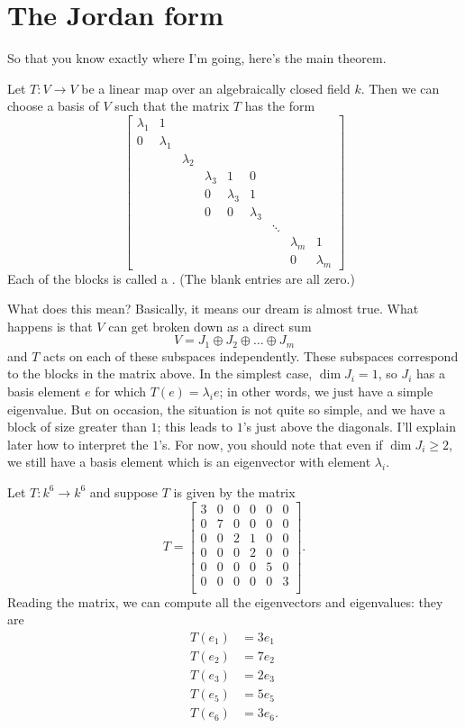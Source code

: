 \section{The Jordan form}
So that you know exactly where I'm going, here's the main theorem.
\begin{theorem}
	Let $T : V \to V$ be a linear map over an algebraically closed field $k$.
	Then we can choose a basis of $V$ such that the matrix $T$ has the form
	\[
	\begin{bmatrix}
		\lambda_1 & 1 \\
		0 & \lambda_1 \\
		&& \lambda_2 \\
		&&& \lambda_3 & 1 & 0 \\
		&&& 0 & \lambda_3 & 1 \\
		&&& 0 & 0 & \lambda_3 \\
		&&&&&& \ddots \\
		&&&&&&& \lambda_m & 1 \\
		&&&&&&& 0 & \lambda_m
	\end{bmatrix}
	\]
	Each of the blocks is called a .
	(The blank entries are all zero.)
\end{theorem}
What does this mean?
Basically, it means our dream is almost true.
What happens is that $V$ can get broken down as a direct sum
\[ V = J_1 \oplus J_2 \oplus \dots \oplus J_m \]
and $T$ acts on each of these subspaces independently.
These subspaces correspond to the blocks in the matrix above.
In the simplest case, $\dim J_i = 1$, so $J_i$ has a basis element $e$ for which $T(e) = \lambda_i e$;
in other words, we just have a simple eigenvalue.
But on occasion, the situation is not quite so simple, and we have a block of size greater than $1$;
this leads to $1$'s just above the diagonals.
I'll explain later how to interpret the $1$'s.
For now, you should note that even if $\dim J_i \ge 2$, we still have a basis element
which is an eigenvector with element $\lambda_i$.

\begin{example}
	Let $T : k^6 \to k^6$ and suppose $T$ is given by the matrix
	\[ 
		T = \begin{bmatrix}
			3 & 0 & 0 & 0 & 0 & 0 \\
			0 & 7 & 0 & 0 & 0 & 0 \\
			0 & 0 & 2 & 1 & 0 & 0 \\
			0 & 0 & 0 & 2 & 0 & 0 \\
			0 & 0 & 0 & 0 & 5 & 0 \\
			0 & 0 & 0 & 0 & 0 & 3 \\
		\end{bmatrix}.
	\]
	Reading the matrix, we can compute all the eigenvectors and eigenvalues:
	they are
	\begin{align*}
		T(e_1) &= 3e_1 \\
		T(e_2) &= 7e_2 \\
		T(e_3) &= 2e_3 \\
		T(e_5) &= 5e_5 \\
		T(e_6) &= 3e_6.
	\end{align*}
\end{example}

